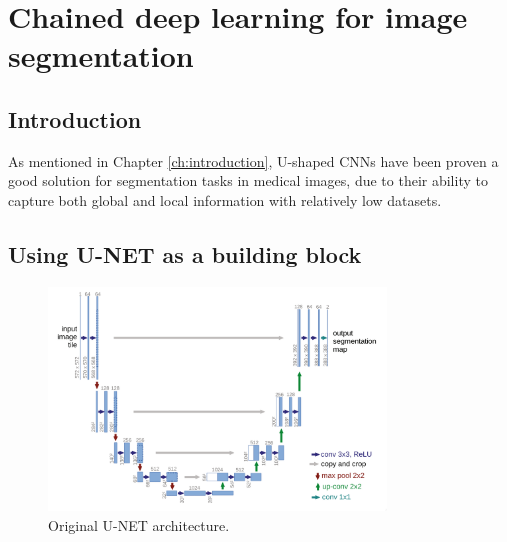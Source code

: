 \chapter{Chained deep learning for image
segmentation}\label{ch:chained_deep_learning_seg}

\section{Introduction}

As mentioned in Chapter \ref{ch:introduction}, U-shaped \glspl{CNN} have been
proven a good solution for segmentation tasks in medical images, due to their
ability to capture both global and local information with relatively low
datasets.
\section{Using U-NET as a building block}

\begin{figure}[h]
  \centering
  \includegraphics[width=0.8\textwidth]{Cap5/Figures/unet_architecture.png}
  \caption{Original U-NET architecture.}
  \label{fig:unet_architecture}
\end{figure}
